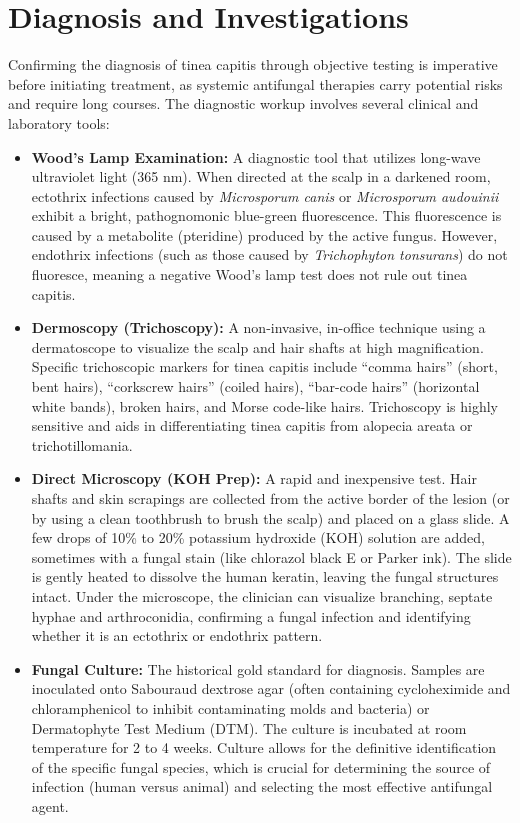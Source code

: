 \section*{Diagnosis and Investigations}
Confirming the diagnosis of tinea capitis through objective testing is imperative before initiating treatment, as systemic antifungal therapies carry potential risks and require long courses. The diagnostic workup involves several clinical and laboratory tools:
\begin{itemize}
    \item \textbf{Wood's Lamp Examination:} A diagnostic tool that utilizes long-wave ultraviolet light (365 nm). When directed at the scalp in a darkened room, ectothrix infections caused by \textit{Microsporum canis} or \textit{Microsporum audouinii} exhibit a bright, pathognomonic blue-green fluorescence. This fluorescence is caused by a metabolite (pteridine) produced by the active fungus. However, endothrix infections (such as those caused by \textit{Trichophyton tonsurans}) do not fluoresce, meaning a negative Wood's lamp test does not rule out tinea capitis.
    \item \textbf{Dermoscopy (Trichoscopy):} A non-invasive, in-office technique using a dermatoscope to visualize the scalp and hair shafts at high magnification. Specific trichoscopic markers for tinea capitis include ``comma hairs'' (short, bent hairs), ``corkscrew hairs'' (coiled hairs), ``bar-code hairs'' (horizontal white bands), broken hairs, and Morse code-like hairs. Trichoscopy is highly sensitive and aids in differentiating tinea capitis from alopecia areata or trichotillomania.
    \item \textbf{Direct Microscopy (KOH Prep):} A rapid and inexpensive test. Hair shafts and skin scrapings are collected from the active border of the lesion (or by using a clean toothbrush to brush the scalp) and placed on a glass slide. A few drops of 10\% to 20\% potassium hydroxide (KOH) solution are added, sometimes with a fungal stain (like chlorazol black E or Parker ink). The slide is gently heated to dissolve the human keratin, leaving the fungal structures intact. Under the microscope, the clinician can visualize branching, septate hyphae and arthroconidia, confirming a fungal infection and identifying whether it is an ectothrix or endothrix pattern.
    \item \textbf{Fungal Culture:} The historical gold standard for diagnosis. Samples are inoculated onto Sabouraud dextrose agar (often containing cycloheximide and chloramphenicol to inhibit contaminating molds and bacteria) or Dermatophyte Test Medium (DTM). The culture is incubated at room temperature for 2 to 4 weeks. Culture allows for the definitive identification of the specific fungal species, which is crucial for determining the source of infection (human versus animal) and selecting the most effective antifungal agent.

\end{itemize}
